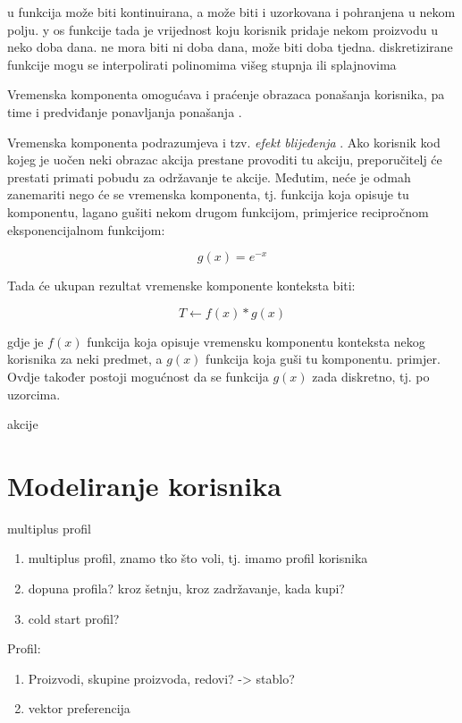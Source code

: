 \documentclass[times, utf8, diplomski, numeric]{fer}
\begin{document}
u funkcija može biti kontinuirana, a može biti i uzorkovana i
pohranjena u nekom polju. y os funkcije tada je vrijednost koju korisnik
pridaje nekom proizvodu u neko doba dana. ne mora biti ni doba dana, može biti
doba tjedna. diskretizirane funkcije mogu se interpolirati polinomima višeg
stupnja ili splajnovima

Vremenska komponenta omogućava i praćenje obrazaca ponašanja korisnika, pa time
i predviđanje ponavljanja ponašanja .

Vremenska komponenta podrazumjeva i tzv. \emph{efekt blijeđenja} . Ako korisnik kod kojeg je uočen neki obrazac akcija prestane provoditi
tu akciju, preporučitelj će prestati primati pobudu za održavanje te akcije.
Međutim, neće je odmah zanemariti nego će se vremenska komponenta, tj. funkcija
koja opisuje tu komponentu, lagano gušiti nekom drugom funkcijom, primjerice
recipročnom eksponencijalnom funkcijom:

\begin{equation}
	\label{eq:RecipExp}
	g(x) = e^{-x}
\end{equation}

Tada će ukupan rezultat vremenske komponente konteksta biti:

\begin{equation}
	\label{eq:Gusenje}
	T \leftarrow f(x) \ast g(x)
\end{equation}

gdje je $f(x)$ funkcija koja opisuje vremensku komponentu konteksta nekog
korisnika za neki predmet, a $g(x)$ funkcija koja guši tu komponentu.
primjer. Ovdje također postoji mogućnost da se funkcija $g(x)$ zada diskretno,
tj. po uzorcima.

akcije

\section{Modeliranje korisnika}
multiplus profil

\begin{enumerate}
  \item multiplus profil, znamo tko što voli, tj. imamo profil korisnika
  \item dopuna profila? kroz šetnju, kroz zadržavanje, kada kupi?
  \item cold start profil?
\end{enumerate}

Profil:
\begin{enumerate}
  \item Proizvodi, skupine proizvoda, redovi? -> stablo?
  \item vektor preferencija
\end{enumerate}
\end{document}
